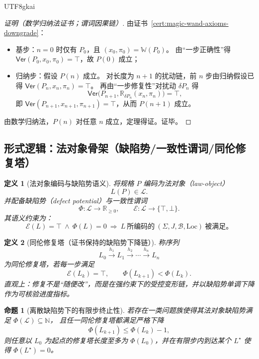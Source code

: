 \documentclass[12pt]{article}
\newtheorem{definition}{定义}[section]
\newtheorem{proposition}{命题}[section]
\newcommand{\RR}{\mathbb{R}}
\newcommand{\NN}{\mathbb{N}}
\newcommand{\LawSpace}{\ensuremath{\mathcal{L}}}
\begin{document}
\begin{CJK*}{UTF8}{gkai}
\begin{proof}[证明（数学归纳法证书；谓词因果链）]
由证书~\ref{cert:magic-wand-axioms-downgrade}：
\begin{itemize}
  \item 基步：$n=0$ 时仅有 $P_0$，且 $(x_0,\pi_0)=\mathbb{W}(P_0)$。
  由“一步正确性”得 $\mathsf{Ver}(P_0,x_0,\pi_0)=\top$，故 $P(0)$ 成立；
  \item 归纳步：假设 $P(n)$ 成立。
  对长度为 $n+1$ 的扰动链，前 $n$ 步由归纳假设已得 $\mathsf{Ver}(P_n,x_n,\pi_n)=\top$。
  再由“一步修复性”对扰动 $\delta P_n$ 得
  \[
    \mathsf{Ver}\!\bigl(P_{n+1},\mathbb{R}_{\delta P_n}(x_n,\pi_n)\bigr)=\top,
  \]
  即 $\mathsf{Ver}(P_{n+1},x_{n+1},\pi_{n+1})=\top$，从而 $P(n+1)$ 成立。
\end{itemize}
由数学归纳法，$P(n)$ 对任意 $n$ 成立，定理得证。证毕。
\end{proof}

\subsection{形式逻辑：法对象骨架（缺陷势/一致性谓词/同伦修复塔）}
\label{sec:magic-wand-law-object-skeleton}

\begin{definition}[法对象编码与缺陷势语义]
\label{def:magic-wand-law-object}
将规格 $P$ 编码为法对象（law-object）
\[
  L(P)\in\LawSpace.
\]
并配备缺陷势（defect potential）与一致性谓词
\[
  \Phi:\LawSpace\to\RR_{\ge 0},\qquad
  \mathcal{E}:\LawSpace\to\{\top,\bot\}.
\]
其语义约束为：
\[
  \mathcal{E}(L)=\top\ \wedge\ \Phi(L)=0
  \ \Longrightarrow\
  L\ \text{所编码的}\ (\Sigma,J,\mathcal{B},\mathrm{Loc})\ \text{被满足。}
\]
\end{definition}

\begin{definition}[同伦修复塔（证书保持的缺陷势下降链）]
\label{def:magic-wand-homotopy-repair-tower}
称序列
\[
  L_0 \xrightarrow{h_1} L_1 \xrightarrow{h_2}\cdots\xrightarrow{h_n} L_n
\]
为同伦修复塔，若每一步满足
\[
  \mathcal{E}(L_k)=\top,\qquad
  \Phi(L_{k+1})<\Phi(L_k).
\]
直观上：修复不是“随便改”，而是在强约束下的受控变形链，并以缺陷势单调下降作为可核验进度指标。
\end{definition}

\begin{proposition}[离散缺陷势下的有限步终止性]
\label{prop:magic-wand-discrete-termination}
若存在一类问题族使得其法对象缺陷势满足 $\Phi(\LawSpace)\subseteq\NN$，
且任一同伦修复塔都满足严格下降
\[
  \Phi(L_{k+1})\le \Phi(L_k)-1,
\]
则任意以 $L_0$ 为起点的修复塔长度至多为 $\Phi(L_0)$，并在有限步内到达某个 $L^\star$ 使得 $\Phi(L^\star)=0$。
\end{proposition}


\end{CJK*}
\end{document}
